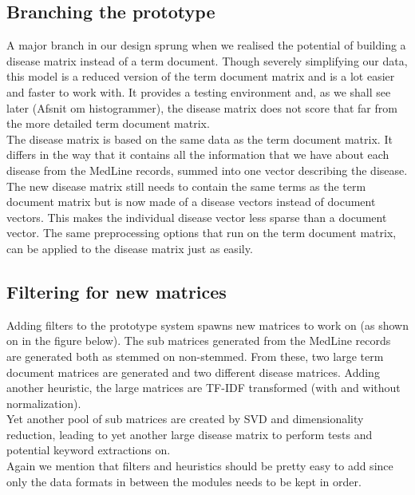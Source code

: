 \subsection{Branching the prototype\label{DiseaseMatrix}}

A major branch in our design sprung when we realised the potential of
building a disease matrix instead of a term document. Though severely
simplifying our data, this model is a reduced version of the term
document matrix and is a lot easier and faster to work with. It
provides a testing environment and, as we shall see later (Afsnit om
histogrammer), the disease matrix does not score that far from the
more detailed term document matrix.\\

The disease matrix is based on the same data as the term document
matrix. It differs in the way that it contains all the information
that we have about each disease from the MedLine records, summed into
one vector describing the disease. The new disease matrix still needs to
contain the same terms as the term document matrix but is now made of
a disease vectors instead of document vectors. This makes the
individual disease vector less sparse than a document vector. The same
preprocessing options that run on the term document matrix, can be
applied to the disease matrix just as easily.

\subsection{Filtering for new matrices\label{FilteringMatrix}}

Adding filters to the prototype system spawns new matrices to work on
(as shown on in the figure below). The sub matrices generated from the
MedLine records are generated both as stemmed on non-stemmed. From
these, two large term document matrices are generated and two
different disease matrices. Adding another heuristic, the large
matrices are TF-IDF transformed (with and without normalization).\\

Yet another pool of sub matrices are created by SVD and dimensionality
reduction, leading to yet another large disease matrix to perform
tests and potential keyword extractions on.\\

Again we mention that filters and heuristics should be pretty easy to
add since only the data formats in between the modules needs to be
kept in order.

